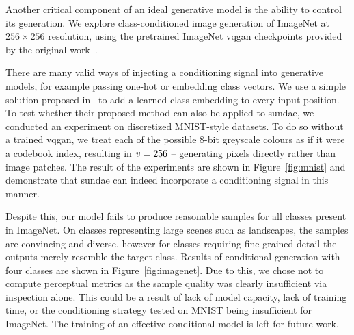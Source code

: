 Another critical component of an ideal generative model is the ability to
control its generation. We explore class-conditioned image generation of
ImageNet at $256 \times 256$ resolution, using the pretrained ImageNet
\gls{vqgan} checkpoints provided by the original work~\cite{esser2021taming}. 

There are many valid ways of injecting a conditioning signal into generative
models, for example passing one-hot or embedding class vectors. We use a simple
solution proposed in~\cite{parmar2018image} to add a learned class embedding to
every input position. To test whether their proposed method can also be applied
to \gls{sundae}, we conducted an experiment on discretized MNIST-style
datasets. To do so without a trained \gls{vqgan}, we treat each of the possible
8-bit greyscale colours as if it were a codebook index, resulting in
$v = 256$ -- generating pixels directly rather than image patches.
The result of the experiments are shown in Figure~\ref{fig:mnist} and
demonstrate that \gls{sundae} can indeed incorporate a conditioning signal in
this manner.



Despite this, our model fails to produce reasonable samples for all classes
present in ImageNet. On classes representing large scenes such as landscapes,
the samples are convincing and diverse, however for classes requiring
fine-grained detail the outputs merely resemble the target class. Results of
conditional generation with four classes are shown in Figure~\ref{fig:imagenet}.
Due to this, we chose not to compute perceptual metrics as the sample quality
was clearly insufficient via inspection alone. This could be a result of lack of
model capacity, lack of training time, or the conditioning strategy tested on
MNIST being insufficient for ImageNet. The training of an effective conditional
model is left for future work.


